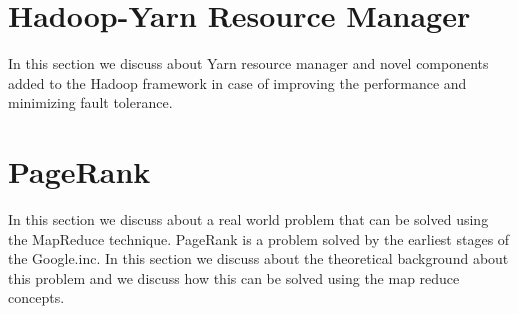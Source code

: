 \section{Hadoop-Yarn Resource Manager}

In this section we discuss about Yarn resource manager and novel components added to the
Hadoop framework in case of improving the performance and minimizing fault tolerance. 


\section{PageRank}

In this section we discuss about a real world problem that can be solved using the MapReduce
technique. PageRank is a problem solved by the earliest stages of the Google.inc. In this
section we discuss about the theoretical background about this problem and we discuss how this
can be solved using the map reduce concepts.


